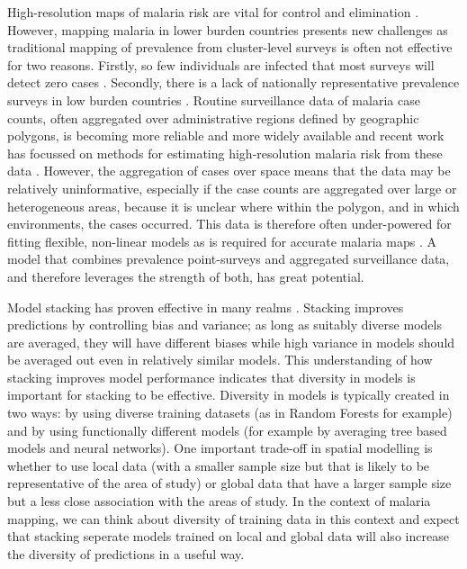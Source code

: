 \documentclass[11pt]{article}
\begin{document}
High-resolution maps of malaria risk are vital for control and elimination \citep{weiss2019mapping, battle2019mapping}.
However, mapping malaria in lower burden countries presents new challenges as traditional mapping of prevalence from cluster-level surveys \citep{weiss2019mapping, bhatt2017improved, battle2019mapping, bhatt2015effect} is often not effective for two reasons.
Firstly, so few individuals are infected that most surveys will detect zero cases \citep{sturrock2016mapping}.
Secondly, there is a lack of nationally representative prevalence surveys in low burden countries \citep{sturrock2016mapping, sturrock2014fine}. 
Routine surveillance data of malaria case counts, often aggregated over administrative regions defined by geographic polygons, is becoming more reliable and more widely available \citep{sturrock2016mapping} and recent work has focussed on methods for estimating high-resolution malaria risk from these data \citep{sturrock2014fine, wilson2017pointless, law2018variational, taylor2017continuous, li2012log}. 
However, the aggregation of cases over space means that the data may be relatively uninformative, especially if the case counts are aggregated over large or heterogeneous areas, because it is unclear where within the polygon, and in which environments, the cases occurred. 
This data is therefore often under-powered for fitting flexible, non-linear models as is required for accurate malaria maps \citep{bhatt2017improved, bhatt2015effect}. 
A model that combines prevalence point-surveys and aggregated surveillance data, and therefore leverages the strength of both, has great potential.

Model stacking has proven effective in many realms \citep{sill2009feature, bhatt2017improved, hao2019review}. 
Stacking improves predictions by controlling bias and variance; as long as suitably diverse models are averaged, they will have different biases while high variance in models should be averaged out even in relatively similar models.
This understanding of how stacking improves model performance indicates that diversity in models is important for stacking to be effective.
Diversity in models is typically created in two ways: by using diverse training datasets (as in Random Forests for example) and by using functionally different models (for example by averaging tree based models and neural networks).
One important trade-off in spatial modelling is whether to use local data (with a smaller sample size but that is likely to be representative of the area of study) or global data that have a larger sample size but a less close association with the areas of study.
In the context of malaria mapping, we can think about diversity of training data in this context and expect that stacking seperate models trained on local and global data will also increase the diversity of predictions in a useful way.
\end{document}
